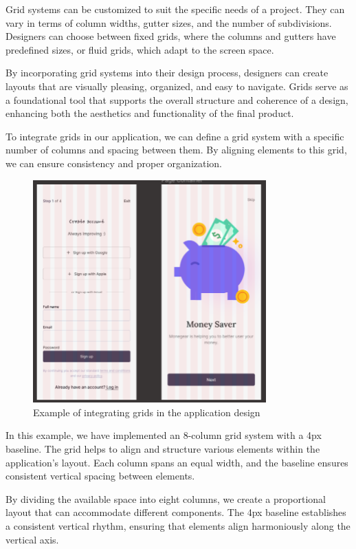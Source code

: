 Grid systems can be customized to suit the specific needs of a project. They can vary in terms of column widths, gutter sizes, and the number of subdivisions. Designers can choose between fixed grids, where the columns and gutters have predefined sizes, or fluid grids, which adapt to the screen space.

By incorporating grid systems into their design process, designers can create layouts that are visually pleasing, organized, and easy to navigate. Grids serve as a foundational tool that supports the overall structure and coherence of a design, enhancing both the aesthetics and functionality of the final product.

To integrate grids in our application, we can define a grid system with a specific number of columns and spacing between them. By aligning elements to this grid, we can ensure consistency and proper organization.
\cite{webdesignres}
\begin{figure}[htbp]
  \centering
  \includegraphics[width=0.8\textwidth]{Graphics/Design/Grids/image.png}
  \caption{Example of integrating grids in the application design}
  \label{fig:grid-example}
\end{figure}

In this example, we have implemented an 8-column grid system with a 4px baseline. The grid helps to align and structure various elements within the application's layout. Each column spans an equal width, and the baseline ensures consistent vertical spacing between elements.

By dividing the available space into eight columns, we create a proportional layout that can accommodate different components. The 4px baseline establishes a consistent vertical rhythm, ensuring that elements align harmoniously along the vertical axis.

